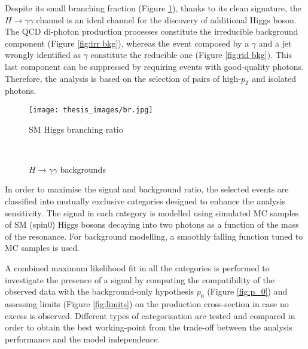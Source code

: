 \documentclass[a4paper, oneside, 11pt, openright]{book}
\begin{document}
 	 	Despite its small branching fraction (Figure \ref{fig: br}), thanks to its clean signature, the $H\to\gamma\gamma$ channel is an ideal channel for the discovery of additional Higgs boson. The QCD di-photon production processes constitute the irreducible background component (Figure \ref{fig:irr bkg}), whereas the event composed by a $\gamma$ and a jet wrongly identified as $\gamma$ constitute the reducible one (Figure \ref{fig:rid bkg}). This last component can be suppressed by requiring events with good-quality photons. Therefore, the analysis is based on the selection of pairs of high-$p_T$ and isolated photons.
 		\begin{figure}
 			\centering
 			\texttt{[image: thesis\_images/br.jpg]}
 			\caption{SM Higgs branching ratio}
 			\label{fig: br}
 		\end{figure}
	 	\begin{figure}
	 		\centering
	 		\\				
	 		\caption{$H\rightarrow\gamma\gamma$ backgrounds}
	 		\label{fig:bkgs}
	 	\end{figure}In order to maximise the signal and background ratio, the selected events are classified into mutually exclusive categories designed to enhance the analysis sensitivity. The signal in each category is modelled using simulated MC samples of SM (spin0) Higgs bosons decaying into two photons as a function of the mass of the resonance. For background modelling, a smoothly falling function tuned to MC samples is used.
 		
 		A combined maximum likelihood fit in all the categories is performed to investigate the presence of a signal by computing the compatibility of the observed data with the background-only hypothesis $p_0$ (Figure \ref{fig:p_0}) and assessing limits (Figure \ref{fig:limits}) on the production cross-section in case no excess is observed. Different types of categorisation are tested and compared in order to obtain the best working-point from the trade-off between the analysis performance and the model independence.
 		
\end{document}
